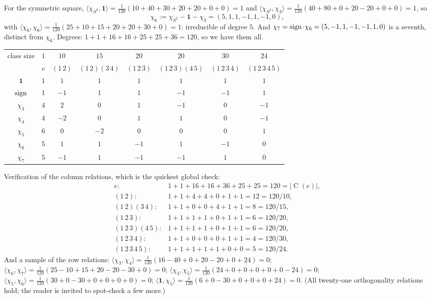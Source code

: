 \documentclass[a4paper]{scrartcl}
\newcommand{\Cent}{\operatorname{C}}
\newcommand{\ip}[2]{\langle #1, #2 \rangle}
\begin{document}
For the symmetric square, $\ip{\chi_{S^2}}{\mathbf 1} = \frac1{120}(10+40+30+20+20+0+0) = 1$ and $\ip{\chi_{S^2}}{\chi_3} = \frac1{120}(40 + 80 + 0 + 20 - 20 + 0 + 0) = 1$, so
$$\chi_6 := \chi_{S^2} - \mathbf 1 - \chi_3 = (5,1,1,-1,1,-1,0),$$
with $\ip{\chi_6}{\chi_6} = \frac1{120}(25 + 10 + 15 + 20 + 20 + 30 + 0) = 1$: irreducible of degree $5$. And $\chi_7 = \operatorname{sign}\cdot\chi_6 = (5,-1,1,-1,-1,1,0)$ is a seventh, distinct from $\chi_6$. Degrees: $1+1+16+16+25+25+36 = 120$, so we have them all.

\begin{center}
\renewcommand{\arraystretch}{1.35}
\setlength{\tabcolsep}{7pt}
\begin{tabular}{c|ccccccc}
\toprule
class size & $1$ & $10$ & $15$ & $20$ & $20$ & $30$ & $24$\\
 & $e$ & $(1\,2)$ & $(1\,2)(3\,4)$ & $(1\,2\,3)$ & $(1\,2\,3)(4\,5)$ & $(1\,2\,3\,4)$ & $(1\,2\,3\,4\,5)$\\
\midrule
$\mathbf 1$ & $1$ & $1$ & $1$ & $1$ & $1$ & $1$ & $1$\\
$\operatorname{sign}$ & $1$ & $-1$ & $1$ & $1$ & $-1$ & $-1$ & $1$\\
$\chi_3$ & $4$ & $2$ & $0$ & $1$ & $-1$ & $0$ & $-1$\\
$\chi_4$ & $4$ & $-2$ & $0$ & $1$ & $1$ & $0$ & $-1$\\
$\chi_5$ & $6$ & $0$ & $-2$ & $0$ & $0$ & $0$ & $1$\\
$\chi_6$ & $5$ & $1$ & $1$ & $-1$ & $1$ & $-1$ & $0$\\
$\chi_7$ & $5$ & $-1$ & $1$ & $-1$ & $-1$ & $1$ & $0$\\
\bottomrule
\end{tabular}
\end{center}

Verification of the column relations, which is the quickest global check:
$$\begin{array}{ll}
e: & 1+1+16+16+36+25+25 = 120 = |\Cent(e)|,\\
(1\,2): & 1+1+4+4+0+1+1 = 12 = 120/10,\\
(1\,2)(3\,4): & 1+1+0+0+4+1+1 = 8 = 120/15,\\
(1\,2\,3): & 1+1+1+1+0+1+1 = 6 = 120/20,\\
(1\,2\,3)(4\,5): & 1+1+1+1+0+1+1 = 6 = 120/20,\\
(1\,2\,3\,4): & 1+1+0+0+0+1+1 = 4 = 120/30,\\
(1\,2\,3\,4\,5): & 1+1+1+1+1+0+0 = 5 = 120/24.
\end{array}$$
And a sample of the row relations: $\ip{\chi_3}{\chi_4} = \frac1{120}(16 - 40 + 0 + 20 - 20 + 0 + 24) = 0$; $\ip{\chi_6}{\chi_7} = \frac1{120}(25 - 10 + 15 + 20 - 20 - 30 + 0) = 0$; $\ip{\chi_3}{\chi_5} = \frac1{120}(24 + 0 + 0 + 0 + 0 + 0 - 24) = 0$; $\ip{\chi_5}{\chi_6} = \frac1{120}(30 + 0 - 30 + 0+0+0+0) = 0$; $\ip{\mathbf 1}{\chi_5} = \frac1{120}(6 + 0 - 30 + 0 + 0 + 0 + 24) = 0$. (All twenty-one orthogonality relations hold; the reader is invited to spot-check a few more.)
\end{document}
